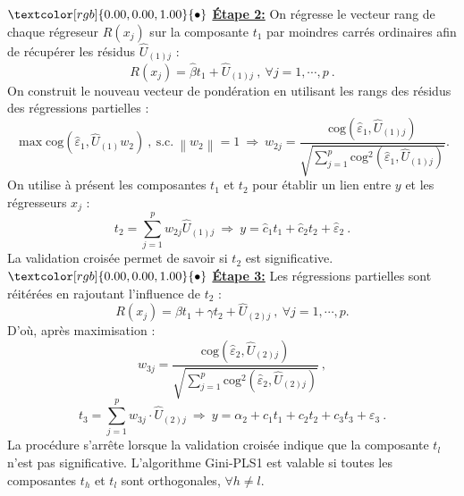 \documentclass[a4paper, 12pt]{article}
\newcommand{\bulle}{\textcolor[rgb]{0.00,0.00,1.00}{\bullet}}
\newcommand{\cog}{\text{cog}}
\numberwithin{equation}{section}
\begin{document}
$\bulle$ \underline{\textbf{Étape 2:}}  On régresse le vecteur rang de chaque régreseur $R(x_j)$ sur la composante $t_1$ par moindres carrés ordinaires afin de récupérer les résidus $\hat{U}_{(1)j}$ : 
\[
R(x_j) = \hat{\beta}t_1 + \hat{U}_{(1)j} \ , \ \forall j = 1,\cdots, p \ .
\]
On construit le nouveau vecteur de pondération en utilisant les rangs des résidus des régressions partielles :
\[
\max \text{cog}(\hat{\varepsilon}_1,\hat{U}_{(1)} w_2) \ , \ \text{s.c.} \ \left\|w_2\right\|=1 \ \Longrightarrow \ w_{2j} = \frac{\cog(\hat{\varepsilon}_1,\hat{U}_{(1)j})}{\sqrt{\sum_{j=1}^p \cog^2(\hat{\varepsilon}_1,\hat{U}_{(1)j})}} .
\]
On utilise à présent les composantes $t_1$ et $t_2$ pour établir un lien entre $y$ et les régresseurs $x_j$ :
\[
t_2 = \sum^p_{j=1} w_{2j} \hat{U}_{(1)j} \ \Longrightarrow \ y = \hat{c}_1 t_1 + \hat{c}_2 t_2 + \hat{\varepsilon}_2 \ .
\]
La validation croisée permet de savoir si $t_2$ est significative.\\

$\bulle$ \underline{\textbf{Étape 3:}} Les régressions partielles sont réitérées en rajoutant l'influence de $t_2$ :
\[
R(x_j) = \beta t_1 + \gamma t_2 + \hat{U}_{(2)j} \ , \ \forall j = 1,\cdots, p.
\]
D'où, après maximisation :
\[
w_{3j} = \frac{\cog(\hat{\varepsilon}_2,\hat{U}_{(2)j})}{\sqrt{\sum_{j=1}^p \cog^2(\hat{\varepsilon}_2,\hat{U}_{(2)j})}} \ ,
\]
\[
t_3 = \sum_{j=1}^p w_{3j}\cdot \hat{U}_{(2)j} \ \Longrightarrow \ y = \alpha_2 + c_1 t_1 + c_2 t_2 + c_3 t_3 + \varepsilon_3 \ .
\]
La procédure s'arrête lorsque la validation croisée indique que la composante $t_l$ n'est pas significative. L'algorithme Gini-PLS1 est valable si toutes les composantes $t_h$ et $t_l$ sont orthogonales, $\forall h\neq l$. 

\medskip
\end{document}
